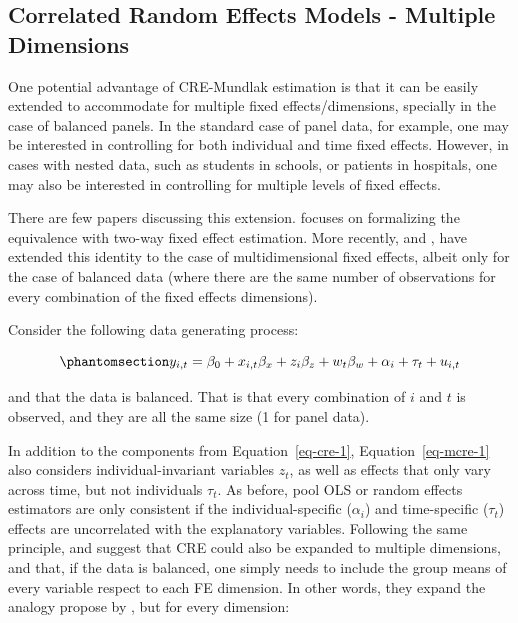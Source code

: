 \documentclass[bib]{statapress}
\begin{document}
\subsection{Correlated Random Effects Models - Multiple
Dimensions}\label{correlated-random-effects-models---multiple-dimensions}

One potential advantage of CRE-Mundlak estimation is that it can be
easily extended to accommodate for multiple fixed effects/dimensions,
specially in the case of balanced panels. In the standard case of panel
data, for example, one may be interested in controlling for both
individual and time fixed effects. However, in cases with nested data,
such as students in schools, or patients in hospitals, one may also be
interested in controlling for multiple levels of fixed effects.

There are few papers discussing this extension. \citet{baltagi2023}
focuses on formalizing the equivalence with two-way fixed effect
estimation. More recently, \citet{baltagi2024} and \citet{yang2022},
have extended this identity to the case of multidimensional fixed
effects, albeit only for the case of balanced data (where there are the
same number of observations for every combination of the fixed effects
dimensions).

Consider the following data generating process:

\begin{equation}\phantomsection\label{eq-mcre-1}{y_{i,t} = \beta_0 + x_{i,t}\beta_x + z_{i}\beta_z + w_{t}\beta_w + \alpha_i + \tau_t + u_{i,t}
}\end{equation}

and that the data is balanced. That is that every combination of \(i\)
and \(t\) is observed, and they are all the same size (1 for panel
data).

In addition to the components from Equation~\ref{eq-cre-1},
Equation~\ref{eq-mcre-1} also considers individual-invariant variables
\(z_{t}\), as well as effects that only vary across time, but not
individuals \(\tau_t\). As before, pool OLS or random effects estimators
are only consistent if the individual-specific (\(\alpha_i\)) and
time-specific (\(\tau_t\)) effects are uncorrelated with the explanatory
variables. Following the same principle, \citet{baltagi2024} and
\citet{yang2022} suggest that CRE could also be expanded to multiple
dimensions, and that, if the data is balanced, one simply needs to
include the group means of every variable respect to each FE dimension.
In other words, they expand the analogy propose by
\citet{mundlak1978pooling}, but for every dimension:
\end{document}
